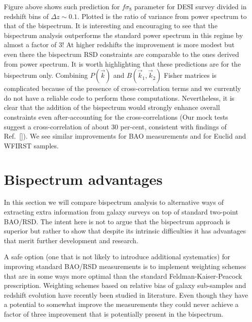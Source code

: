 Figure above shows such prediction for $f\sigma_8$ parameter for DESI
survey divided in redshift bins of $\Delta z \sim 0.1$. Plotted is the ratio of
variance from power spectrum to that of the bispectrum. It is interesting and
encouraging to see that the bispectrum analysis outperforms the standard power
spectrum in this regime by almost a factor of 3! At higher redshifts the
improvement is more modest but even there the bispectrum RSD constraints are
comparable to the ones derived from power spectrum. It is worth highlighting
that these predictions are for the bispectrum only. Combining $P(\vec{k})$ and
$B(\vec{k}_1,\vec{k}_2)$ Fisher matrices is complicated because of the presence
of cross-correlation terms and we currently do not have a reliable code to
perform these computations. Nevertheless, it is clear that the addition of the
bispectrum would strongly enhance overall constraints even after-accounting for
the cross-correlations (Our mock tests suggest a cross-correlation of about 30
per-cent, consistent with findings of Ref.~[]). We see similar improvements for
BAO measurements and for Euclid and WFIRST samples.

\section{Bispectrum advantages}

In this section we will compare bispectrum analysis to alternative ways of
extracting extra information from galaxy surveys on top of standard two-point
BAO/RSD. The intent here is not to argue that the bispectrum approach is
superior but rather to show that despite its intrinsic difficulties it has
advantages that merit further development and research.

A safe option (one that is not likely to introduce additional systematics) for
improving standard BAO/RSD measurements is to implement weighting schemes that
are in some ways more optimal than the standard Feldman-Kaiser-Peacock
prescription. Weighting schemes based on relative bias of galaxy sub-samples
and redshift evolution have recently been studied in literature. Even though
they have a potential to somewhat improve the measurements they could never
achieve a factor of three improvement that is potentially present in the
bispectrum.

